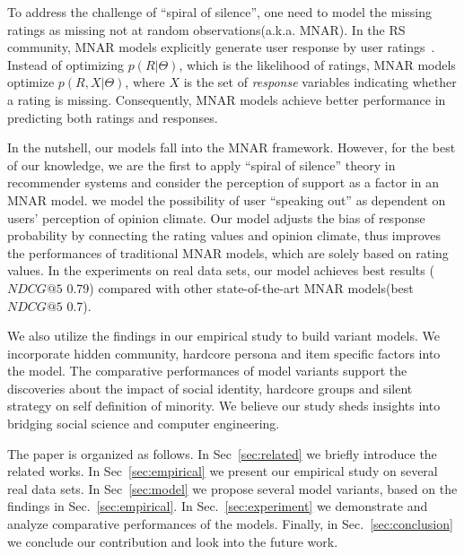 \documentclass[sigconf]{acmart}
\begin{document}
To address the challenge of ``spiral of silence'', one need to model the missing ratings as missing not at random observations(a.k.a. MNAR). In the RS community,  MNAR models explicitly generate user response by user ratings~\cite{Hernandez-Lobato2014Probabilistic,Steck2010Training,Marlin2009Collaborative}. Instead of optimizing $p(R|\Theta)$, which is the likelihood of ratings, MNAR models optimize $p(R,X|\Theta)$, where $X$ is the set of \textit{response} variables indicating whether a rating is missing. Consequently, MNAR models achieve better performance in predicting both ratings and responses.

In the nutshell, our models fall into the MNAR framework. However, for the best of our knowledge, we are the first to apply ``spiral of silence'' theory in recommender systems and consider the perception of support as a factor in an MNAR model. we model the possibility of user ``speaking out'' as dependent on users' perception of opinion climate.  Our model adjusts the bias of response probability by connecting the rating values and opinion climate, thus improves the performances of traditional MNAR models, which are solely based on rating values.  In the experiments on real data sets, our model achieves best results ($NDCG@5$ 0.79) compared with other state-of-the-art MNAR models(best $NDCG@5$ 0.7).

We also utilize the findings in our empirical study to build variant models. We incorporate hidden community, hardcore persona and item specific factors into the model. The comparative performances of model variants support the discoveries about the impact of social identity, hardcore groups and silent strategy on self definition of minority. We believe our study sheds insights into bridging social science and computer engineering.

The paper is organized as follows. In Sec~\ref{sec:related} we briefly introduce the related works. In Sec~\ref{sec:empirical} we present our empirical study on several real data sets. In Sec~\ref{sec:model} we propose several model variants, based on the findings in Sec.~\ref{sec:empirical}. In Sec.~\ref{sec:experiment} we demonstrate and analyze comparative performances of the models. Finally, in Sec.~\ref{sec:conclusion} we conclude our contribution and look into the future work.
\end{document}
